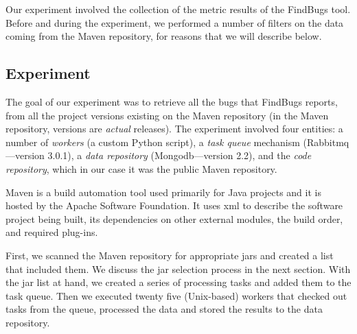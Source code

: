 \documentclass{sig-alternate}
\begin{document}
Our experiment involved the collection of the metric results of the
FindBugs tool. Before and during the experiment, we performed a number
of filters on the data coming from the Maven repository, for reasons
that we will describe below.

\subsection{Experiment}
\label{sec:exp}

The goal of our experiment was to retrieve all the bugs that FindBugs reports,
from all the project versions existing on the Maven repository (in the Maven
repository, versions are {\it actual} releases). The experiment involved four entities:
a number of {\it workers} (a custom Python script), a {\it task queue}
mechanism (Rabbit{\sc mq}---version 3.0.1),
a {\it data repository} (Mongo{\sc db}---version 2.2),
and the {\it code repository}, which in our case it was
the public Maven repository.


Maven is a build automation tool used primarily for Java projects and it is
hosted by the Apache Software Foundation.
It uses {\sc xml} to describe the software project being built, its dependencies
on other external modules, the build order, and required plug-ins. 

First, we scanned the Maven repository for appropriate {\sc jar}s and created a
list that included them. We discuss the {\sc jar} selection process in the next 
section. With the {\sc jar} list at hand, we created a series of processing tasks
and added them to the task queue. Then we executed twenty five (Unix-based)
workers that checked out tasks from the queue, processed the data and stored the
results to the data repository.
\end{document}
